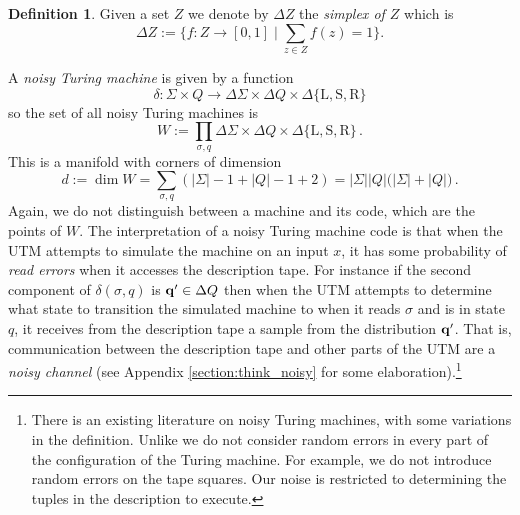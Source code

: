 \documentclass[english,letter paper,12pt,reqno]{article}
\theoremstyle{definition}
\newtheorem{definition}[theorem]{Definition}
\def\be{\begin{equation}}
\def\ee{\end{equation}}
\newcommand{\lto}{\longrightarrow}
\begin{document}
\begin{definition}
\label{def:simplex}
    Given a set $Z$ we denote by $\Delta Z$ the \emph{simplex of $Z$} which is
    \begin{equation}
        \Delta Z := \big\{f: Z \lto [0,1] \mid \sum_{z \in Z}f(z) = 1 \big\}.
    \end{equation}
\end{definition}
A \emph{noisy Turing machine} is given by a function
\begin{equation}
\delta: \Sigma \times Q \lto \Delta \Sigma \times \Delta Q \times \Delta \{ \text{L}, \text{S}, \text{R} \}
\end{equation}
so the set of all noisy Turing machines is
\begin{equation}
\label{eq:noisy}
        W := \prod_{\sigma, q}\Delta \Sigma \times \Delta Q \times \Delta\{\text{L}, \text{S},\text{R}\}\,.
\end{equation}
This is a manifold with corners of dimension
\be\label{eq:d_dim_W}
d := \dim W = \sum_{\sigma, q}( |\Sigma| - 1 + |Q| - 1 + 2 ) = |\Sigma||Q|\big(|\Sigma| + |Q|\big)\,.
\ee
Again, we do not distinguish between a machine and its code, which are the points of $W$. The interpretation of a noisy Turing machine code is that when the UTM attempts to simulate the machine on an input $x$, it has some probability of \emph{read errors} when it accesses the description tape. For instance if the second component of $\delta(\sigma,q)$ is $\bold{q}' \in \Delta Q$ then when the UTM attempts to determine what state to transition the simulated machine to when it reads $\sigma$ and is in state $q$, it receives from the description tape a sample from the distribution $\bold{q}'$. That is, communication between the description tape and other parts of the UTM are a \emph{noisy channel} (see Appendix \ref{section:think_noisy} for some elaboration).\footnote{There is an existing literature on noisy Turing machines, with some variations in the definition. Unlike \cite{asarin2005noisy} we do not consider random errors in every part of the configuration of the Turing machine. For example, we do not introduce random errors on the tape squares. Our noise is restricted to determining the tuples in the description to execute.}
\end{document}
